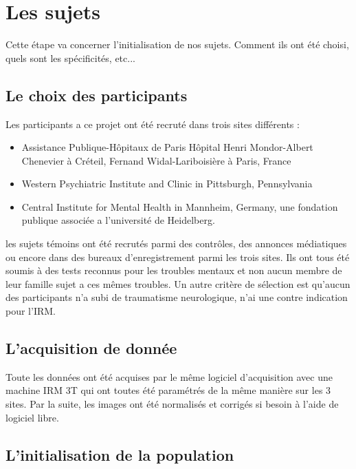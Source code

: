 \section{Les sujets}

Cette étape va concerner l'initialisation de nos sujets. Comment ils ont été choisi, quels sont les spécificités, etc...

\subsection{Le choix des participants}

Les participants a ce projet ont été recruté dans trois sites différents : 
\begin{itemize}
	\item Assistance Publique-Hôpitaux de Paris Hôpital Henri Mondor-Albert Chenevier à Créteil, Fernand Widal-Lariboisière à Paris, France
	\item Western Psychiatric Institute and Clinic in Pittsburgh, Pennsylvania
	\item Central Institute for Mental Health in Mannheim, Germany, une fondation publique associée a l'université de Heidelberg.
\end{itemize}
les sujets témoins ont été recrutés parmi des contrôles, des annonces médiatiques ou encore dans des bureaux d'enregistrement parmi les trois sites. Ils ont tous été soumis à des tests reconnus pour les troubles mentaux et non aucun membre de leur famille sujet a ces mêmes troubles. Un autre critère de sélection est qu'aucun des participants n'a subi de traumatisme neurologique, n'ai une contre indication pour l'IRM.


\subsection{L'acquisition de donnée}

Toute les données ont été acquises par le même logiciel d'acquisition avec une machine IRM 3T qui ont toutes été paramétrés de la même manière sur les 3 sites. Par la suite, les images ont été normalisés et corrigés si besoin à l'aide de logiciel libre.


\subsection{L'initialisation de la population} 

